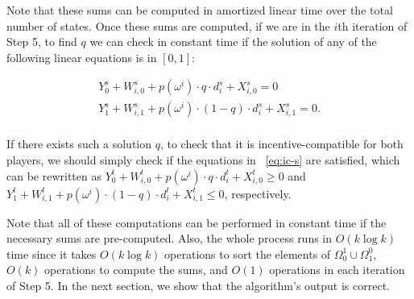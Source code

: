 \documentclass[submission,copyright,creativecommons]{eptcs}
\newcommand{\commentout}[1]{}
\begin{document}
\commentout{
and their analogues for the receiver:

$$\begin{array}{l}
Y_0^r := \sum_{\omega \in \Omega_0^0} p(\omega) \cdot (u_r(\omega, 0) - u_r(\omega,1))\\
Y_1^r := \sum_{\omega \in \Omega_1^1} p(\omega) \cdot (u_r(\omega, 0) - u_r(\omega, 1))\\
W_{i,0}^{(r,s)} := \sum_{j < i, \omega^j \in \Omega_0^1} p(\omega^j) \cdot (u_r(\omega^j, 0) - u_r(\omega^j, 1))\\
W_{i,1}^{(r,s)} := \sum_{j < i, \omega^j \in \Omega_1^0} p(\omega^j) \cdot (u_r(\omega^j, 0) - u_r(\omega^j, 1))\\
W_{i,0}^{(r,r)} := \sum_{j > i, \omega^j \in \Omega_0^1} p(\omega^j) \cdot (u_r(\omega^j, 0) - u_r(\omega^j, 1))\\
W_{i,1}^{(r,r)} := \sum_{j > i, \omega^j \in \Omega_1^0} p(\omega^j) \cdot (u_r(\omega^j, 0) - u_r(\omega^j, 1)).
\end{array}$$
}


Note that these sums can be computed in amortized linear time over the total number of states. Once these sums are computed, if we are in the $i$th iteration of Step 5, to find $q$ we can check in constant time if the solution of any of the following linear equations is in $[0,1]$:

$$\begin{array}{l}
Y_0^s + W_{i,0}^{s} + p(\omega^i) \cdot q \cdot d_i^s + X_{i,0}^{s} = 0\\
Y_1^s + W_{i,1}^{s} + p(\omega^i) \cdot (1-q) \cdot d_i^s+ X_{i,1}^{s} = 0.\\
\end{array}$$

If there exists such a solution $q$, to check that it is incentive-compatible for both players, we should simply check if the equations in ~\ref{eq:ic-s} are satisfied, which can be rewritten as $Y_0^t + W_{i,0}^{t} + p(\omega^i) \cdot q \cdot d_i^t + X_{i,0}^{t} \ge 0$ and $Y_1^t + W_{i,1}^{t} + p(\omega^i) \cdot (1-q) \cdot d_i^t + X_{i,1}^{t} \le 0$, respectively. 
\commentout{
following inequalities are satisfied:

$$\begin{array}{l}
Y_0^s + W_{i,0}^{s} + p(\omega^i) \cdot q \cdot d_i^s + X_{i,0}^{s} \ge 0\\
Y_1^s + W_{i,1}^{s} + p(\omega^i) \cdot (1-q) \cdot d_i^s + X_{i,1}^{s} \le 0.\\
Y_0^r + W_{i,0}^{r} + p(\omega^i) \cdot q \cdot d_i^r + X_{i,0}^{r} \ge 0\\
Y_1^r + W_{i,1}^{r} + p(\omega^i) \cdot (1-q) \cdot d_i^r + X_{i,1}^{r} \le 0.\\
\end{array}$$
}
Note that all of these computations can be performed in constant time if the necessary sums are pre-computed. Also, the whole process runs in $O(k \log k)$ time since it takes $O(k \log k)$ operations to sort the elements of $\Omega_0^1 \cup \Omega_1^0$, $O(k)$ operations to compute the sums, and $O(1)$ operations in each iteration of Step 5. In the next section, we show that the algorithm's output is correct. 
\end{document}
